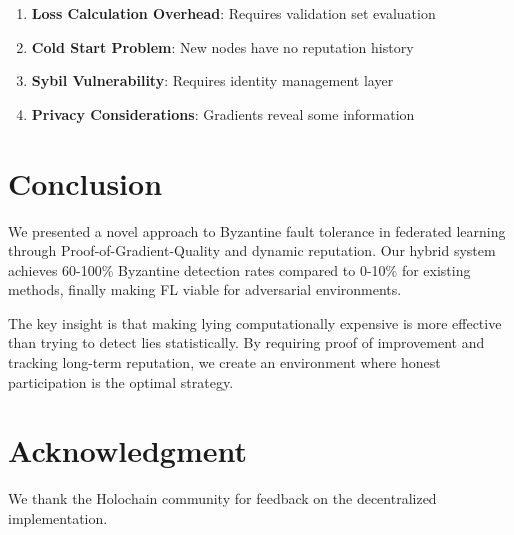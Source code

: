 \documentclass[conference]{IEEEtran}
\begin{document}
\begin{enumerate}
\item \textbf{Loss Calculation Overhead}: Requires validation set evaluation
\item \textbf{Cold Start Problem}: New nodes have no reputation history
\item \textbf{Sybil Vulnerability}: Requires identity management layer
\item \textbf{Privacy Considerations}: Gradients reveal some information
\end{enumerate}

\section{Conclusion}

We presented a novel approach to Byzantine fault tolerance in federated learning through Proof-of-Gradient-Quality and dynamic reputation. Our hybrid system achieves 60-100\% Byzantine detection rates compared to 0-10\% for existing methods, finally making FL viable for adversarial environments.

The key insight is that making lying computationally expensive is more effective than trying to detect lies statistically. By requiring proof of improvement and tracking long-term reputation, we create an environment where honest participation is the optimal strategy.

\section*{Acknowledgment}

We thank the Holochain community for feedback on the decentralized implementation.
\end{document}
